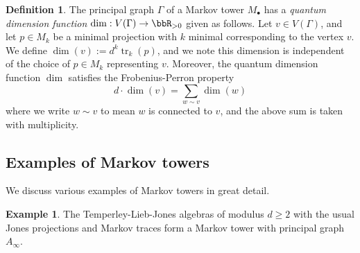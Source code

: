 \documentclass[11pt]{article}
\theoremstyle{plain}
\theoremstyle{definition}
\newtheorem{defn}[thm]{Definition}
\newtheorem{ex}[thm]{Example}
\DeclareMathOperator{\tr}{tr}
\begin{document}
\begin{defn}
The principal graph $\Gamma$ of a Markov tower $M_\bullet$ has a \emph{quantum dimension function} $\dim : V(\Gamma) \to \bbR_{>0}$ given as follows.
Let $v \in V(\Gamma)$, and let $p\in M_k$ be a minimal projection with $k$ minimal corresponding to the vertex $v$.
We define $\dim(v) :=d^k \tr_k(p)$, and we note this dimension is independent of the choice of $p \in M_k$ representing $v$.
Moreover, the quantum dimension function $\dim$ satisfies the Frobenius-Perron property
\begin{equation}
\label{eq:QuantumDimension}
d\cdot \dim(v) 
=
\sum_{w\sim v}
\dim(w)
\end{equation}
where we write $w\sim v$ to mean $w$ is connected to $v$, and the above sum is taken with multiplicity.
\end{defn}

\subsection{Examples of Markov towers}

We discuss various examples of Markov towers in great detail.

\begin{ex}
The Temperley-Lieb-Jones algebras of modulus $d\geq 2$ with the usual Jones projections and Markov traces form a Markov tower with principal graph $A_{\infty}$.
\end{ex}
\end{document}
